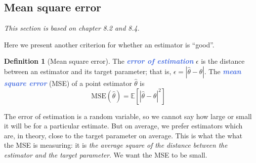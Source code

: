 \documentclass[10pt]{article}
\theoremstyle{definition}
\newtheorem{definition}[theorem]{Definition}
\newcommand{\1}[1]{\textbf{1}_{\left[#1\right]}} %
\def\E{\mathbb{E}} %
\newcommand{\demph}[1]{\textcolor{RoyalBlue}{\textbf{\slshape #1}}} %
\begin{document}
\subsection{Mean square error}
\textit{This section is based on chapter 8.2 and 8.4.}

Here we present another criterion for whether an estimator is ``good''.

\begin{definition}[Mean square error]
  \label{def:mean-square-error}
  The \demph{error of estimation} $\epsilon$ is the distance between an
  estimator and its target parameter; that is,
  $\epsilon= | \widehat{\theta}-\theta |$. The \demph{mean square
    error} (MSE) of a point estimator $\widehat{\theta}$ is
  \begin{equation*}
    \mathrm{MSE}(\widehat{\theta}) = \E\left[| \widehat{\theta}-\theta |^{2}  \right]
  \end{equation*}
\end{definition}

The error of estimation is a random variable, so we cannot say how large or
small it will be for a particular estimate. But on average, we prefer
estimators which are, in theory, close to the target parameter on average.
This is what the what the MSE is measuring: it is \textit{the average square of the
distance between the estimator and the target parameter}. We want the MSE to be
small.
\end{document}
